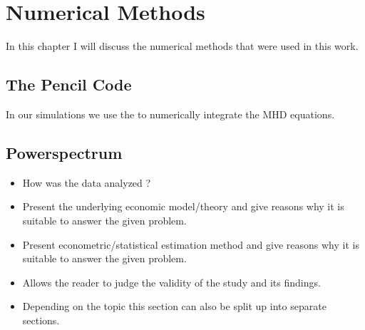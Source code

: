 
\chapter{Numerical Methods}\label{Chap:Methods}


In this chapter I will discuss the numerical methods that were used in this work.

\section{The Pencil Code}
In our simulations we use the \pencil to numerically integrate the MHD equations.
\section{Powerspectrum}

\begin{itemize}
    \item How was the data analyzed ?

    \item Present the underlying economic model/theory and
        give reasons why it is suitable to answer the given problem.

    \item Present econometric/statistical estimation method and
        give reasons why it is suitable to answer the given problem.

    \item Allows the reader to judge the validity of the study and
        its findings.

    \item Depending on the topic this section can also be split up
        into separate sections.

\end{itemize}
